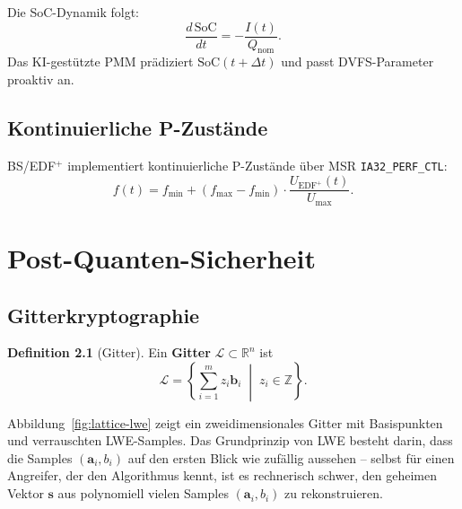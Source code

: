 ﻿\documentclass[a4paper,12pt]{scrreprt}
\theoremstyle{definition}
\newtheorem{definition}{Definition}[chapter]
\begin{document}
	Die SoC-Dynamik folgt:
	\[
	\frac{d\,\mathrm{SoC}}{dt} = -\frac{I(t)}{Q_{\mathrm{nom}}}.
	\]
	Das KI-gestützte PMM \cite{Epp2026liionp} prädiziert $\mathrm{SoC}(t + \Delta t)$
	und passt DVFS-Parameter proaktiv an.
	
	\section{Kontinuierliche P-Zustände}
	
	BS/EDF$^+$ implementiert kontinuierliche P-Zustände über MSR \texttt{IA32\_PERF\_CTL}:
	\[
	f(t) = f_{\min} + (f_{\max} - f_{\min}) \cdot \frac{U_{\mathrm{EDF}^+}(t)}{U_{\max}}.
	\]
	
	\chapter{Post-Quanten-Sicherheit}
	
	\section{Gitterkryptographie}

	\begin{definition}[Gitter]
		Ein \textbf{Gitter} $\mathcal{L} \subset \mathbb{R}^n$ ist
		\[
		\mathcal{L} = \left\{\sum_{i=1}^m z_i \mathbf{b}_i \;\middle|\; z_i \in \mathbb{Z}\right\}.
		\]
	\end{definition}

	Abbildung~\ref{fig:lattice-lwe} zeigt ein zweidimensionales Gitter mit
	Basispunkten und verrauschten LWE-Samples. Das Grundprinzip von LWE
	besteht darin, dass die Samples $(\mathbf{a}_i, b_i)$ auf den ersten
	Blick wie zufällig aussehen -- selbst für einen Angreifer, der den
	Algorithmus kennt, ist es rechnerisch schwer, den geheimen Vektor
	$\mathbf{s}$ aus polynomiell vielen Samples $(\mathbf{a}_i, b_i)$ zu
	rekonstruieren.
\end{document}
